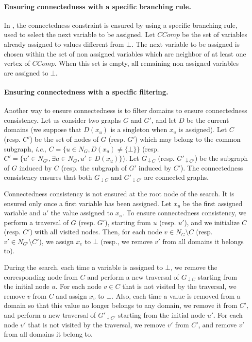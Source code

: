 \documentclass{llncs}
\begin{document}
\paragraph{Ensuring connectedness with a specific branching rule.}
In \cite{DBLP:conf/mco/VismaraV08}, the connectedness constraint is ensured by using a specific branching rule, used to select the next variable to be assigned. Let $CComp$ be the set of variables already assigned to values different from $\bot$. The next variable to be assigned is chosen within the set of non assigned variables which are neighbor of at least one vertex of $CComp$. When this set is empty, all remaining non assigned variables are assigned to $\bot$.

\paragraph{Ensuring connectedness with a specific filtering.}
Another way to ensure connectedness is to filter domains to ensure connectedness consistency. Let us consider two graphs $G$ and $G'$, and let $D$ be the current domains (we suppose that $D(x_u)$ is a singleton when $x_u$ is assigned). Let $C$ (resp. $C'$) be the set of nodes of $G$ (resp. $G'$) which may belong to the common subgraph, {\em i.e.}, $C=\{ u\in N_{G}, D(x_u)\neq\{\bot\}\}$ (resp. $C' = \{u'\in N_{G'}, \exists u\in N_G, u'\in D(x_u)\}$). Let $G_{\downarrow C}$ (resp. $G'_{\downarrow C'}$) be the subgraph of $G$ induced by $C$ (resp. the subgraph of $G'$ induced by $C'$).
The connectedness consistency ensures that both $G_{\downarrow C}$ and $G'_{\downarrow C'}$ are connected graphs.

Connectedness consistency is not ensured at the root node of the search. It is ensured only once a first variable has been assigned. Let $x_u$ be the first assigned variable and $u'$ the value assigned to $x_u$. To ensure connectedness consistency, we perform a traversal of $G$ (resp. $G'$), starting from $u$ (resp. $u'$), and we initialize $C$ (resp. $C'$) with all visited nodes. Then, for each node $v\in N_G\setminus C$ (resp. $v'\in N_{G'}\setminus C'$), we assign $x_v$ to $\bot$ (resp., we remove $v'$ from all domains it belongs to).

During the search, each time a variable is assigned to $\bot$, we remove the corresponding node from $C$ and perform a new traversal of $G_{\downarrow C}$ starting from the initial node $u$. For each node $v\in C$ that is not visited by the traversal, we remove $v$ from $C$ and assign $x_v$ to $\bot$. Also, each time a value is removed from a domain so that this value no longer belongs to any domain, we remove it from $C'$, and perform a new traversal of $G'_{\downarrow C'}$ starting from the initial node $u'$. For each node $v'$ that is not visited by the traversal, we remove $v'$ from $C'$, and remove $v'$ from all domains it belong to.
\end{document}
